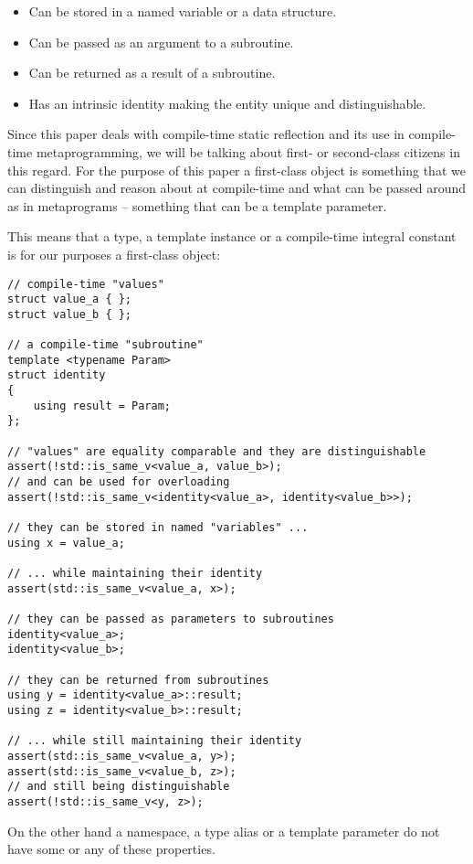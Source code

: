 \begin{itemize}
	\item{Can be stored in a named variable or a data structure.}
	\item{Can be passed as an argument to a subroutine.}
	\item{Can be returned as a result of a subroutine.}
	\item{Has an intrinsic identity making the entity unique and distinguishable.}
\end{itemize}

Since this paper deals with compile-time static reflection and its use
in compile-time metaprogramming, we will be talking about first- or second-class
citizens in this regard. 
For the purpose of this paper a first-class object is something that
we can distinguish and reason about at compile-time and what can be passed around
as  in metaprograms -- something that can be a template parameter.

This means that a type, a template instance or a compile-time integral constant
is for our purposes a first-class object:

\begin{verbatim}
// compile-time "values"
struct value_a { };
struct value_b { };

// a compile-time "subroutine"
template <typename Param>
struct identity
{
	using result = Param;
};

// "values" are equality comparable and they are distinguishable
assert(!std::is_same_v<value_a, value_b>);
// and can be used for overloading
assert(!std::is_same_v<identity<value_a>, identity<value_b>>);

// they can be stored in named "variables" ...
using x = value_a;

// ... while maintaining their identity
assert(std::is_same_v<value_a, x>);

// they can be passed as parameters to subroutines
identity<value_a>;
identity<value_b>;

// they can be returned from subroutines
using y = identity<value_a>::result;
using z = identity<value_b>::result;

// ... while still maintaining their identity
assert(std::is_same_v<value_a, y>);
assert(std::is_same_v<value_b, z>);
// and still being distinguishable
assert(!std::is_same_v<y, z>);
\end{verbatim}


On the other hand a namespace, a type alias or a template parameter do not have
some or any of these properties.

